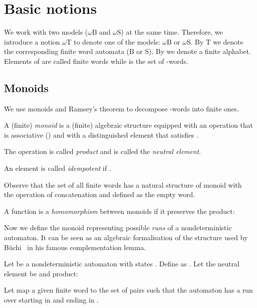 \documentclass{LMCS}
\newcommand{\wB}{\ensuremath{\omega \mathrm{B}}\xspace}
\newcommand{\wS}{\ensuremath{\omega \mathrm{S}}\xspace}
\newcommand{\wT}{\ensuremath{\omega \mathrm{T}}\xspace}
\newcommand{\fT}{\ensuremath{\mathrm{T}}\xspace}
\newcommand{\fB}{\ensuremath{\mathrm{B}}\xspace}
\newcommand{\fS}{\ensuremath{\mathrm{S}}\xspace}
\begin{document}
\section{Basic notions}\label{s:basic}

We work with two models (\wB and \wS) at the same time. Therefore, we introduce a notion \wT to denote one of the models: \wB or \wS. By \fT we denote the corresponding finite word automata (\fB or \fS). By  we denote a finite alphabet. Elements of  are called finite words while  is the set of -words.



\subsection{Monoids}

We use monoids and Ramsey's theorem to decompose -words into finite ones.

\begin{definition}
A (finite) \emph{monoid} is a (finite) algebraic structure  equipped with an operation  that is associative () and with a distinguished element  that satisfies .

The operation  is called \emph{product} and  is called the \emph{neutral element}.

An element  is called \emph{idempotent} if .
\end{definition}

Observe that the set of all finite words  has a natural structure of monoid with the operation of concatenation and  defined as the empty word.

\begin{definition}
A function  is a \emph{homomorphism} between monoids  if it preserves the product:

\end{definition}

Now we define the monoid representing possible \emph{runs} of a nondeterministic automaton. It can be seen as an algebraic formalisation of the structure used by B\"uchi~\cite{buchi_decision} in his famous complementation lemma.

\begin{definition}
Let  be a nondeterministic automaton with states . Define  as . Let the neutral element be  and product:


Let  map a given finite word  to the set of pairs  such that the automaton  has a run over  starting in  and ending in .
\end{definition}
\end{document}
